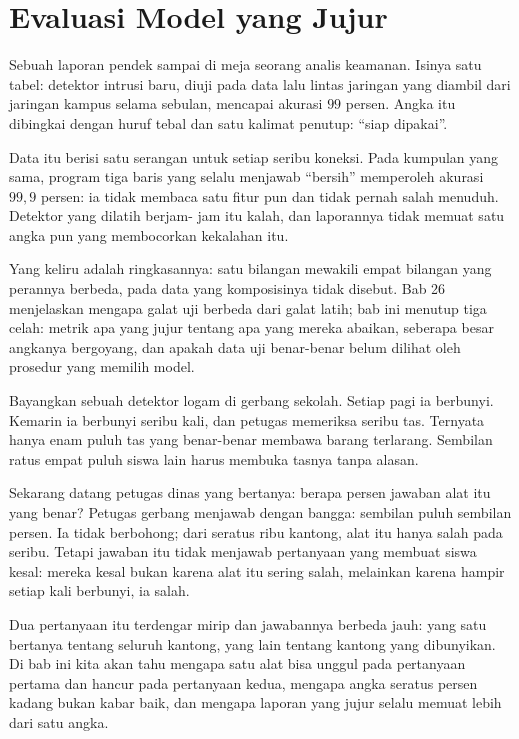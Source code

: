 \chapter{Evaluasi Model yang Jujur}

Sebuah laporan pendek sampai di meja seorang analis keamanan. Isinya satu tabel: detektor
intrusi baru, diuji pada data lalu lintas jaringan yang diambil dari jaringan kampus
selama sebulan, mencapai akurasi $99$ persen. Angka itu dibingkai dengan huruf tebal dan
satu kalimat penutup: ``siap dipakai''.

Data itu berisi satu serangan untuk setiap seribu koneksi. Pada kumpulan yang sama,
program tiga baris yang selalu menjawab ``bersih'' memperoleh akurasi $99{,}9$ persen: ia
tidak membaca satu fitur pun dan tidak pernah salah menuduh. Detektor yang dilatih berjam-
jam itu kalah, dan laporannya tidak memuat satu angka pun yang membocorkan kekalahan itu.

Yang keliru adalah ringkasannya: satu bilangan mewakili empat bilangan yang perannya
berbeda, pada data yang komposisinya tidak disebut. Bab 26 menjelaskan mengapa galat uji
berbeda dari galat latih; bab ini menutup tiga celah: metrik apa yang jujur tentang apa
yang mereka abaikan, seberapa besar angkanya bergoyang, dan apakah data uji benar-benar
belum dilihat oleh prosedur yang memilih model.

\begin{untukanak}
Bayangkan sebuah detektor logam di gerbang sekolah. Setiap pagi ia berbunyi. Kemarin ia
berbunyi seribu kali, dan petugas memeriksa seribu tas. Ternyata hanya enam puluh tas
yang benar-benar membawa barang terlarang. Sembilan ratus empat puluh siswa lain harus
membuka tasnya tanpa alasan.

Sekarang datang petugas dinas yang bertanya: berapa persen jawaban alat itu yang benar?
Petugas gerbang menjawab dengan bangga: sembilan puluh sembilan persen. Ia tidak
berbohong; dari seratus ribu kantong, alat itu hanya salah pada seribu. Tetapi jawaban itu
tidak menjawab pertanyaan yang membuat siswa kesal: mereka kesal bukan karena alat itu
sering salah, melainkan karena hampir setiap kali berbunyi, ia salah.

Dua pertanyaan itu terdengar mirip dan jawabannya berbeda jauh: yang satu bertanya tentang
seluruh kantong, yang lain tentang kantong yang dibunyikan. Di bab ini kita akan tahu
mengapa satu alat bisa unggul pada pertanyaan pertama dan hancur pada pertanyaan kedua,
mengapa angka seratus persen kadang bukan kabar baik, dan mengapa laporan yang jujur selalu
memuat lebih dari satu angka.
\end{untukanak}

